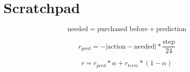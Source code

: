 \usepackage{mathtools}


\section{Scratchpad}


\begin{equation}
    \text{needed} = \text{purchased before} + \text{prediction} 
\end{equation}

\begin{equation}
        r_{\text{pred}} = - | \text{action} - \text{needed} | * \frac{\text{step}}{24}
\end{equation}

\begin{equation}
    r = r_{pred} * \alpha + r_{term} * (1-\alpha)
\end{equation}


